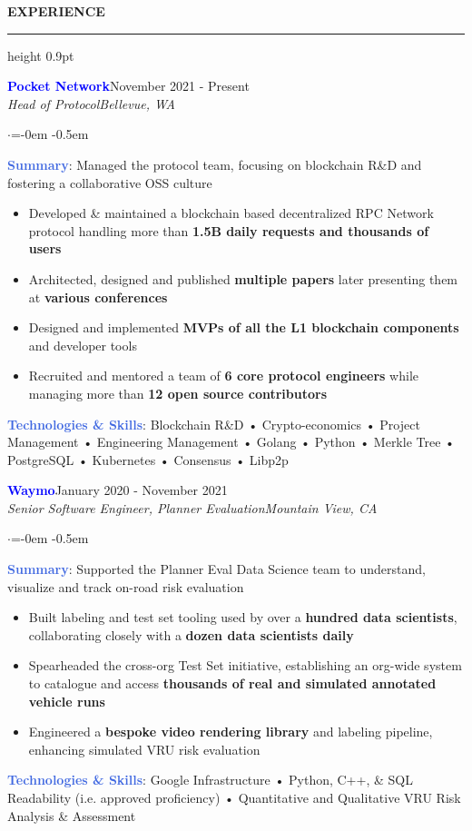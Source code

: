 \documentclass[
    11pt, %
]{resume} %
\newenvironment{rSectionCustom}[1]{
  \Large
  \sectionskip
  \textbf{\textcolor{Cerulean}{\MakeUppercase{#1}}}
  \vspace{0.5em}
  {\color{Blue}\hrule height 0.9pt}
  \vspace{0.25em}

  \begin{list}{}{
    \setlength{\leftmargin}{1.5em}
  }
  \item[]
}{
    \vspace{1em}
    \end{list}
}
\newenvironment{rSubsection2}[4]{
  \normalsize
  \hspace{-18pt}\textcolor{Blue}{\textbf{\large #1}}\hfill{#2}
  \\
  \hspace*{-18pt}\emph{#3}\hfill\emph{#4}
  \begin{list}{$\cdot$}{\leftmargin=-0em}
  \itemsep -0.5em \vspace{-0.25em}
}{
    \vspace{1em}
    \end{list}
}
\begin{document}
\begin{rSectionCustom}{Experience}

    \begin{rSubsection2}{Pocket Network}{November 2021 - Present}{Head of Protocol}{Bellevue, WA}

        \item[] \textcolor{RoyalBlue}{\textbf{Summary}}: Managed the protocol team, focusing on blockchain R\&D and fostering a collaborative OSS culture
        \begin{itemize}[leftmargin=*]
            \item Developed \& maintained a blockchain based decentralized RPC Network protocol handling more than \textbf{1.5B daily requests and thousands of users}
            \item Architected, designed and published \textbf{multiple papers} later presenting them at \textbf{various conferences}
            \item Designed and implemented \textbf{MVPs of all the L1 blockchain components} and developer tools
            \item Recruited and mentored a team of \textbf{6 core protocol engineers} while managing more than \textbf{12 open source contributors}
        \end{itemize}
        \vspace{0.5em}
        \item[] \textcolor{RoyalBlue}{\textbf{Technologies \& Skills}}: Blockchain R\&D • Crypto-economics • Project Management • Engineering Management • Golang • Python • Merkle Tree • PostgreSQL • Kubernetes • Consensus • Libp2p
    \end{rSubsection2}

    \begin{rSubsection2}{Waymo}{January 2020 - November 2021}{Senior Software Engineer, Planner Evaluation}{Mountain View, CA}
        \item[] \textcolor{RoyalBlue}{\textbf{Summary}}: Supported the Planner Eval Data Science team to understand, visualize and track on-road risk evaluation
        \begin{itemize}[leftmargin=*]
            \item Built labeling and test set tooling used by over a \textbf{hundred data scientists}, collaborating closely with a \textbf{dozen data scientists daily}
            \item Spearheaded the cross-org Test Set initiative, establishing an org-wide system to catalogue and access \textbf{thousands of real and simulated annotated vehicle runs}
            \item Engineered a \textbf{bespoke video rendering library} and labeling pipeline, enhancing simulated VRU risk evaluation
        \end{itemize}
        \vspace{0.5em}
        \item[] \textcolor{RoyalBlue}{\textbf{Technologies \& Skills}}: Google Infrastructure • Python, C++, \& SQL Readability (i.e. approved proficiency) • Quantitative and Qualitative VRU Risk Analysis \& Assessment
    \end{rSubsection2}


\end{rSectionCustom}
\end{document}
